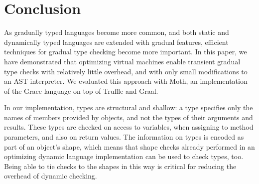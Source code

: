
\section{Conclusion}
\label{sec:conclusion}

As gradually typed languages become more common,
and both static and dynamically typed languages are
extended with gradual features,
efficient techniques for gradual type checking become more important.
%
%
%
%
%
%
In this paper, we have demonstrated that optimizing virtual machines enable
transient gradual type checks with relatively little
overhead, and with only small modifications to an AST interpreter.
We evaluated this approach with Moth, an implementation of the Grace language
on top of Truffle and Graal.
%
%
%

In our implementation, types are structural and shallow: a type
specifies only the names of members provided by objects, and not
the types of their arguments and results.
These types are checked on access to variables,
when assigning to method parameters, and also on return values.
The information on types is encoded as part of an object's shape,
which means that shape checks already performed in an optimizing dynamic
language implementation can be used to check types, too. 
Being able to tie checks to the shapes in this way is critical for 
reducing the overhead of dynamic checking.
%

